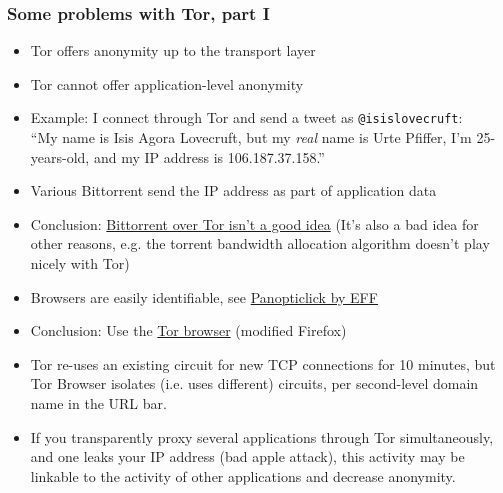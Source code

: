 \begin{frame}
  \frametitle{Some problems with Tor, part I}
  \begin{itemize} 
    \item Tor offers anonymity up to the transport layer
    \item <2-> Tor cannot offer application-level anonymity
    \item <2-> Example: I connect through Tor and send a tweet as \texttt{@isislovecruft}:\\[2mm]
      ``My name is Isis Agora Lovecruft, but my \emph{real} name is Urte
      Pfiffer, I'm 25-years-old, and my IP address is 106.187.37.158.''
    \item<3-> Various Bittorrent send the IP address as part of application data
    \item<3-> Conclusion:
      \href{https://blog.torproject.org/blog/bittorrent-over-tor-isnt-good-idea}{Bittorrent
        over Tor isn't a good idea} (It's also a bad idea for other reasons,
      e.g. the torrent bandwidth allocation algorithm doesn't play nicely with Tor)
    \item<4-> Browsers are easily identifiable, see
      \href{https://panopticlick.eff.org/index.php?action=log&js=yes}{Panopticlick
        by EFF}
    \item<4-> Conclusion: Use the
      \href{https://www.torproject.org/projects/torbrowser.html.en}{Tor browser}
      (modified Firefox)
    \item<5-> Tor re-uses an existing circuit for new TCP connections for 10
      minutes, but Tor Browser isolates (i.e. uses different) circuits, per
      second-level domain name in the URL bar.
    \item<6-> If you transparently proxy several applications through Tor
      simultaneously, and one leaks your IP address (bad apple attack), this
      activity may be linkable to the activity of other applications and
      decrease anonymity.
  \end{itemize} 
\end{frame}


